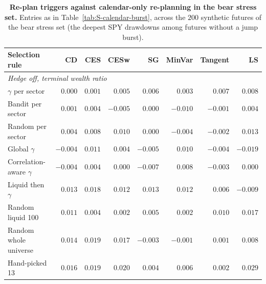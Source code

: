 \begin{table}[H]
\centering
\small
\setlength{\tabcolsep}{4pt}
\caption{\textbf{Re-plan triggers against calendar-only re-planning in the bear stress set.} Entries as in
Table~\ref{tab:S-calendar-burst}, across the $200$ synthetic futures of the bear stress set (the deepest SPY
drawdowns among futures without a jump burst).}
\label{tab:S-calendar-bear}
\begin{tabular}{l*{7}{r}}
\toprule
Selection rule & CD & CES & CESw & SG & MinVar & Tangent & LS \\
\midrule
\multicolumn{8}{l}{\emph{Hedge off, terminal wealth ratio}} \\
$\gamma$ per sector & $0.000$ & $0.001$ & $0.005$ & $0.006$ & $0.003$ & $0.007$ & $0.008$ \\
Bandit per sector & $0.001$ & $0.004$ & $-0.005$ & $0.000$ & $-0.010$ & $-0.001$ & $0.004$ \\
Random per sector & $0.004$ & $0.008$ & $0.010$ & $0.000$ & $-0.004$ & $-0.002$ & $0.013$ \\
\addlinespace[2pt]
Global $\gamma$ & $-0.004$ & $0.011$ & $0.004$ & $-0.005$ & $0.010$ & $-0.004$ & $-0.019$ \\
Correlation-aware $\gamma$ & $-0.004$ & $0.004$ & $0.000$ & $-0.007$ & $0.008$ & $-0.003$ & $0.000$ \\
Liquid then $\gamma$ & $0.013$ & $0.018$ & $0.012$ & $0.013$ & $0.012$ & $0.006$ & $-0.009$ \\
Random liquid 100 & $0.011$ & $0.004$ & $0.002$ & $0.005$ & $0.002$ & $0.010$ & $0.017$ \\
Random whole universe & $0.014$ & $0.019$ & $0.017$ & $-0.003$ & $-0.001$ & $0.001$ & $0.008$ \\
\addlinespace[2pt]
Hand-picked 13 & $0.016$ & $0.019$ & $0.020$ & $0.004$ & $0.006$ & $0.002$ & $0.029$ \\

\end{tabular}
\end{table}
